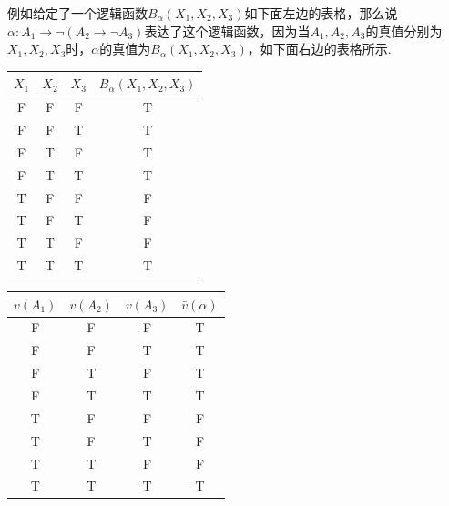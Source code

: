 \begin{note}
    例如给定了一个逻辑函数\(B_\alpha(X_1, X_2, X_3)\)如下面左边的表格，那么说\(\alpha: A_1 \to \neg (A_2 \to \neg A_3)\)表达了这个逻辑函数，因为当\(A_1, A_2, A_3\)的真值分别为\(X_1, X_2, X_3\)时，\(\alpha\)的真值为\(B_\alpha(X_1, X_2, X_3)\)，如下面右边的表格所示.
    
        \begin{center}

            \begin{tabular}{ccc|c}
                \hline
                \(X_1\) & \(X_2\) & \(X_3\) & \(B_\alpha(X_1, X_2, X_3)\) \\
                \hline
                F & F & F & T \\
                F & F & T & T \\
                F & T & F & T \\
                F & T & T & T \\
                T & F & F & F \\
                T & F & T & F \\
                T & T & F & F \\
                T & T & T & T \\
                \hline
            \end{tabular}
            \quad
            \begin{tabular}{ccc|c}
                \hline
                \(v(A_1)\) & \(v(A_2)\) & \(v(A_3)\) & \(\bar{v}(\alpha)\) \\
                \hline
                F & F & F & T \\
                F & F & T & T \\
                F & T & F & T \\
                F & T & T & T \\
                T & F & F & F \\
                T & F & T & F \\
                T & T & F & F \\
                T & T & T & T \\
                \hline
            \end{tabular}

        \end{center}

\end{note}

